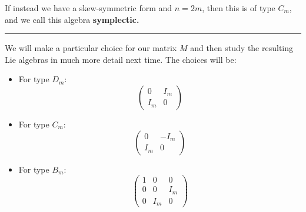 \documentclass[12pt]{article}
\theoremstyle{nonumberbreak}
\theoremstyle{changebreak}
\theoremstyle{nonumberbreak}
\theoremstyle{change}
\newcommand*{\brk}{
\rule{2in}{.1pt}
}
\begin{document}
If instead we have a skew-symmetric form and $n=2m$, then this is of type $C_m$, and we 
call this algebra \textbf{symplectic.}

\brk

We will make a particular choice for our matrix $M$ and then study the resulting
Lie algebras in much more detail next time. The choices will be: 
\begin{itemize}
	\item For type $D_m$:
	\[\begin{pmatrix}
		0 & I_m\\
		I_m & 0
	\end{pmatrix}\]
	\item For type $C_m$:
	\[\begin{pmatrix}
		0 & -I_m\\
		I_m & 0
	\end{pmatrix}\]
	\item For type $B_m$:
	\[\begin{pmatrix}
		1 & 0 & 0\\
		0 & 0 & I_m\\
		0 & I_m & 0
	\end{pmatrix}\]
\end{itemize}
\end{document}
